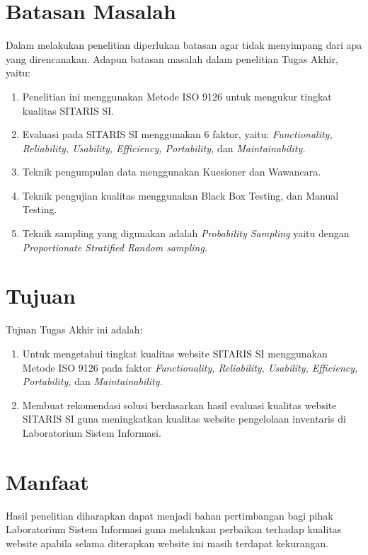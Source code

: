 \section{Batasan Masalah}
Dalam melakukan penelitian diperlukan batasan agar tidak menyimpang dari apa yang direncanakan. Adapun batasan masalah dalam penelitian Tugas Akhir, yaitu:
\begin{enumerate}
	\item Penelitian ini menggunakan Metode ISO 9126 untuk mengukur tingkat kualitas SITARIS SI.
	\item Evaluasi pada SITARIS SI menggunakan 6 faktor, yaitu: \textit{Functionality, Reliability, Usability, Efficiency, Portability,} dan \textit{Maintainability.} 
	\item Teknik pengumpulan data menggunakan Kuesioner dan Wawancara.
	\item Teknik pengujian kualitas menggunakan Black Box Testing, dan Manual Testing.
	\item Teknik sampling yang digunakan adalah \textit{Probability Sampling} yaitu dengan \textit{Proportionate Stratified Random sampling}.
\end{enumerate}

\section{Tujuan}
Tujuan Tugas Akhir ini adalah:
\begin{enumerate}
	\item Untuk mengetahui tingkat kualitas website SITARIS SI menggunakan Metode ISO 9126 pada faktor \textit{Functionality, Reliability, Usability, Efficiency, Portability,} dan \textit{Maintainability.} 
	\item Membuat rekomendasi solusi berdasarkan hasil evaluasi kualitas website SITARIS SI guna meningkatkan kualitas website pengelolaan inventaris di Laboratorium Sistem Informasi.	
\end{enumerate}

\section{Manfaat}
Hasil penelitian diharapkan dapat menjadi bahan pertimbangan bagi pihak Laboratorium Sistem Informasi guna melakukan perbaikan terhadap kualitas website apabila selama diterapkan website ini masih terdapat kekurangan.


